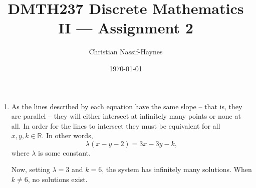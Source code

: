 \documentclass[a4paper]{article}
\begin{document}
	\title{DMTH237 Discrete Mathematics II --- Assignment 2}
	\author{Christian Nassif-Haynes}
	\date{\today}
	\maketitle
		
	\begin{enumerate}
		\item As the lines described by each equation have the same slope -- that is, they are parallel -- they will either intersect at infinitely many points or none at all. In order for the lines to intersect they must be equivalent for all $x, y, k \in \mathbb{R}$. In other words,
		\begin{equation*}
			\lambda (x - y - 2) = 3x - 3y - k,
		\end{equation*}
		where $\lambda$ is some constant.
		
		Now, setting $\lambda = 3$ and $k = 6$, the system has infinitely many solutions. When $k \ne 6$, no solutions exist.
		

\end{enumerate}
\end{document}
